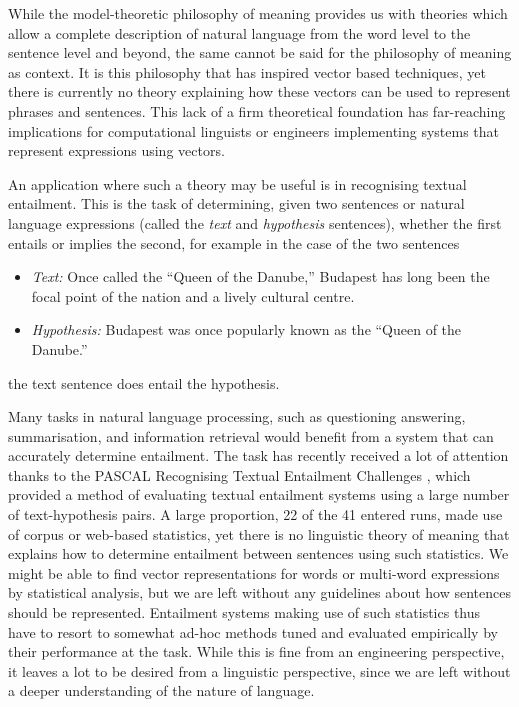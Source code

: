 While the model-theoretic philosophy of meaning provides us with theories which allow a complete description of natural language from the word level to the sentence level and beyond, the same cannot be said for the philosophy of meaning as context. It is this philosophy that has inspired vector based techniques, yet there is currently no theory explaining how these vectors can be used to represent phrases and sentences. This lack of a firm theoretical foundation has far-reaching implications for computational linguists or engineers implementing systems that represent expressions using vectors.

An application where such a theory may be useful is in recognising textual entailment. This is the task of determining, given two sentences or natural language expressions (called the \emph{text} and \emph{hypothesis} sentences), whether the first entails or implies the second, for example in the case of the two sentences
\begin{itemize}
\item \emph{Text:} Once called the ``Queen of the Danube,'' Budapest has long been the focal point of the nation and a lively cultural centre.
\item \emph{Hypothesis:} Budapest was once popularly known as the ``Queen of the Danube.''
\end{itemize}
the text sentence does entail the hypothesis.

Many tasks in natural language processing, such as questioning answering, summarisation, and information retrieval would benefit from a system that can accurately determine entailment. The task has recently received a lot of attention thanks to the PASCAL Recognising Textual Entailment Challenges \citep{Dagan:05,Bar-Haim:06}, which provided a method of evaluating textual entailment systems using a large number of text-hypothesis pairs. A large proportion, 22 of the 41 entered runs, made use of corpus or web-based statistics, yet there is no linguistic theory of meaning that explains how to determine entailment between sentences using such statistics. We might be able to find vector representations for words or multi-word expressions by statistical analysis, but we are left without any guidelines about how sentences should be represented. Entailment systems making use of such statistics thus have to resort to somewhat ad-hoc methods tuned and evaluated empirically by their performance at the task. While this is fine from an engineering perspective, it leaves a lot to be desired from a linguistic perspective, since we are left without a deeper understanding of the nature of language.


